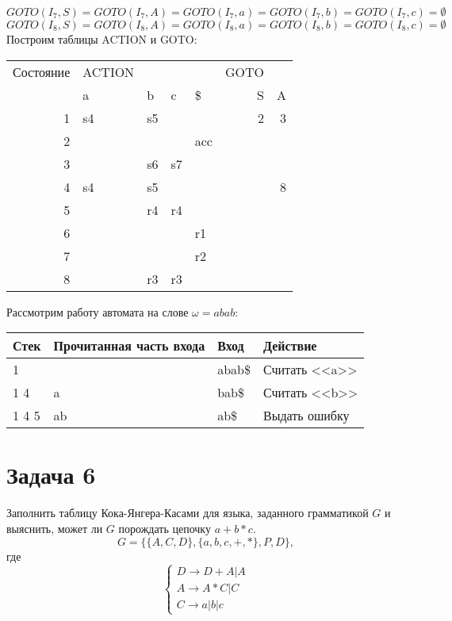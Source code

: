 \documentclass[11pt]{article}
\begin{document}
\begin{equation*}
GOTO(I_7, S) = GOTO(I_7, A) = GOTO(I_7, a) = GOTO(I_7, b) = GOTO(I_7, c) = \emptyset
\end{equation*}
\begin{equation*}
GOTO(I_8, S) = GOTO(I_8, A) = GOTO(I_8, a) = GOTO(I_8, b) = GOTO(I_8, c) = \emptyset
\end{equation*}
Построим таблицы ACTION и GOTO:
\begin{center}
\begin{tabular}{rllllrr}
\hline
Состояние & ACTION &  &  &  & GOTO & \\
 & a & b & c & \$ & S & A\\
\hline
1 & s4 & s5 &  &  & 2 & 3\\
2 &  &  &  & acc &  & \\
3 &  & s6 & s7 &  &  & \\
4 & s4 & s5 &  &  &  & 8\\
5 &  & r4 & r4 &  &  & \\
6 &  &  &  & r1 &  & \\
7 &  &  &  & r2 &  & \\
8 &  & r3 & r3 &  &  & \\
\hline
\end{tabular}
\end{center}
Рассмотрим работу автомата на слове \(\omega = abab\):
\begin{center}
\begin{tabular}{llll}
\hline
Стек & Прочитанная часть входа & Вход & Действие\\
\hline
1 &  & abab\$ & Считать {}<<a>>{}\\
1 4 & a & bab\$ & Считать {}<<b>>{}\\
1 4 5 & ab & ab\$ & Выдать ошибку\\
\hline
\end{tabular}
\end{center}
\section{Задача 6}
\label{sec:org5fb1620}
Заполнить таблицу Кока-Янгера-Касами для языка, заданного грамматикой \(G\) и выяснить, может
ли \(G\) порождать цепочку \(a + b * c\).
\begin{equation}
G = \{\{A, C, D\}, \{a, b, c, +, *\}, P, D\},
\end{equation}
где
\begin{equation}
\begin{cases}
D \rightarrow D + A | A \\
A \rightarrow A * C | C \\
C \rightarrow a | b | c
\end{cases}
\end{equation}
\end{document}
